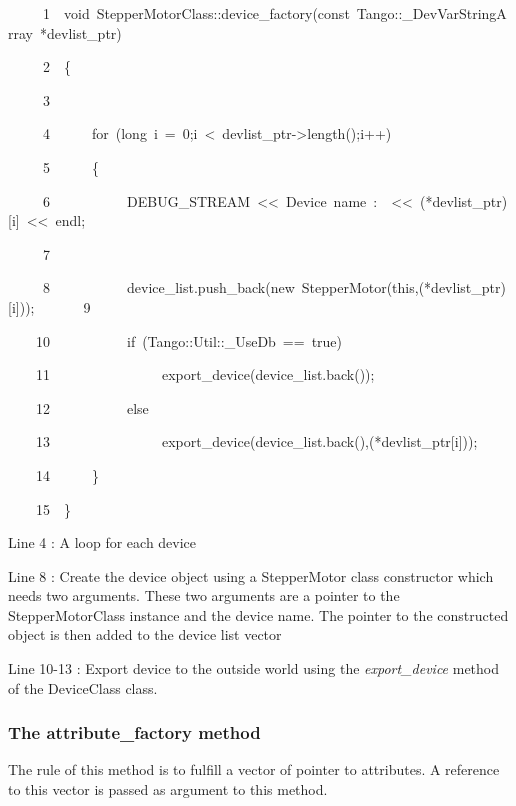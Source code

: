 
\begin{lyxcode}
~~~~~1~~void~StepperMotorClass::device\_factory(const~Tango::\_DevVarStringArray~{*}devlist\_ptr)

~~~~~2~~\{

~~~~~3~~~~~~~~~~

~~~~~4~~~~~~for~(long~i~=~0;i~<~devlist\_ptr->length();i++)

~~~~~5~~~~~~\{

~~~~~6~~~~~~~~~~~DEBUG\_STREAM~<\textcompwordmark{}<~\textquotedbl{}Device~name~:~\textquotedbl{}~<\textcompwordmark{}<~({*}devlist\_ptr){[}i{]}~<\textcompwordmark{}<~endl;

~~~~~7~~~~~~~~~~~~~~~~~~~~~~~~~~~~~~~~~~~~~~~~~~~~~~~~~~

~~~~~8~~~~~~~~~~~device\_list.push\_back(new~StepperMotor(this,({*}devlist\_ptr){[}i{]}));~~~~~~~9~~

~~~~10~~~~~~~~~~~if~(Tango::Util::\_UseDb~==~true)

~~~~11~~~~~~~~~~~~~~~~export\_device(device\_list.back());

~~~~12~~~~~~~~~~~else

~~~~13~~~~~~~~~~~~~~~~export\_device(device\_list.back(),({*}devlist\_ptr{[}i{]}));

~~~~14~~~~~~\}

~~~~15~~\}
\end{lyxcode}


Line 4 : A loop for each device

Line 8 : Create the device object using a StepperMotor class constructor
which needs two arguments. These two arguments are a pointer to the
StepperMotorClass instance and the device name. The pointer to the
constructed object is then added to the device list vector

Line 10-13 : Export device to the outside world using the \emph{export\_device}
method of the DeviceClass class.


\subsubsection{The attribute\_factory method}

The rule of this method is to fulfill a vector of pointer to attributes.
A reference to this vector is passed as argument to this method.

